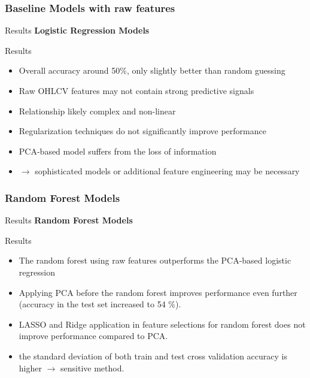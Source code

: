 \documentclass[aspectratio=43]{beamer} %
\begin{document}
\subsubsection{Baseline Models with raw features}
\begin{frame}{Results}
\textbf{Logistic Regression Models}\\
% 
\FloatBarrier
\end{frame}

\begin{frame}{Results}
\begin{itemize}
  \item Overall accuracy around 50\%, only slightly better than random guessing
  \item Raw OHLCV features may not contain strong predictive signals 
  \item Relationship likely complex and non-linear
  \item Regularization techniques do not significantly improve performance
  \item PCA-based model suffers from the loss of information
  \item $\to$ sophisticated models or additional feature engineering may be necessary 
\end{itemize}
\end{frame}

\subsubsection{Random Forest Models}
\begin{frame}{Results}
\textbf{Random Forest Models}\\
% 
\FloatBarrier
\end{frame}

\begin{frame}{Results}
\begin{itemize}
  \item The random forest using raw features outperforms the PCA-based logistic regression
  \item Applying PCA before the random forest improves performance even further (accuracy in the test set increased to 54 \%). 
  \item LASSO and Ridge application in feature selections for random forest does not improve performance compared to PCA. 
  \item the standard deviation of both train and test cross validation accuracy is higher $\to$ sensitive method. 
\end{itemize}
\end{frame}
\end{document}
